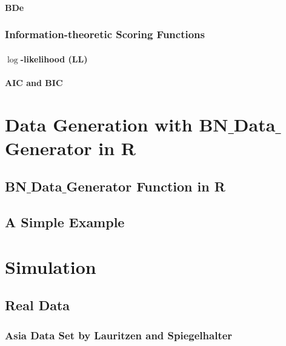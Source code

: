 \documentclass[12pt,a4paper,oneside]{book}
\theoremstyle{plain}
\theoremstyle{definition}
\theoremstyle{remark}
\theoremstyle{definition}
\numberwithin{equation}{chapter}
\begin{document}
\subsubsection{BDe}


\subsection{Information-theoretic Scoring Functions}
\subsubsection{$\log$-likelihood (LL)}


\subsubsection{AIC and BIC}






\chapter{Data Generation with BN$\_$Data$\_$Generator in R}


\section{BN$\_$Data$\_$Generator Function in R}


\section{A Simple Example}






\chapter{Simulation}


\section{Real Data}
\subsection{Asia Data Set by Lauritzen and Spiegelhalter}

\end{document}
